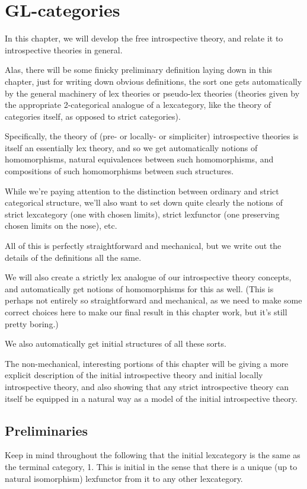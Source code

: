 \section{GL-categories}

In this chapter, we will develop the free introspective theory, and relate it to introspective theories in general. 

Alas, there will be some finicky preliminary definition laying down in this chapter, just for writing down obvious definitions, the sort one gets automatically by the general machinery of lex theories or pseudo-lex theories (theories given by the appropriate 2-categorical analogue of a lexcategory, like the theory of categories itself, as opposed to strict categories).

Specifically, the theory of (pre- or locally- or simpliciter) introspective theories is itself an essentially lex theory, and so we get automatically notions of homomorphisms, natural equivalences between such homomorphisms, and compositions of such homomorphisms between such structures.

While we're paying attention to the distinction between ordinary and strict categorical structure, we'll also want to set down quite clearly the notions of strict lexcategory (one with chosen limits), strict lexfunctor (one preserving chosen limits on the nose), etc.

All of this is perfectly straightforward and mechanical, but we write out the details of the definitions all the same.

We will also create a strictly lex analogue of our introspective theory concepts, and automatically get notions of homomorphisms for this as well. (This is perhaps not entirely so straightforward and mechanical, as we need to make some correct choices here to make our final result in this chapter work, but it's still pretty boring.)

We also automatically get initial structures of all these sorts.

The non-mechanical, interesting portions of this chapter will be giving a more explicit description of the initial introspective theory and initial locally introspective theory, and also showing that any strict introspective theory can itself be equipped in a natural way as a model of the initial introspective theory.

\subsection{Preliminaries}
Keep in mind throughout the following that the initial lexcategory is the same as the terminal category, 1. This is initial in the sense that there is a unique (up to natural isomorphism) lexfunctor from it to any other lexcategory.

